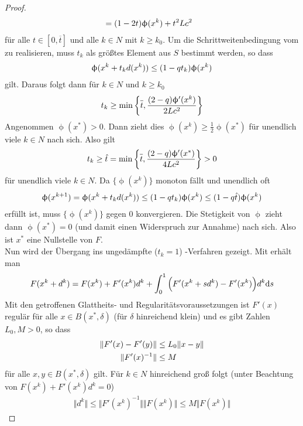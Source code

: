 \begin{proof}
\begin{align}
		&= (1-2t)\upphi(x^k) + t^2Lc^2 \notag
	\end{align}
	für alle $t\in [0,\overline{t}]$ und alle $k\in N$ mit $k\ge k_0$. Um die Schrittweitenbedingung vom  zu realisieren, muss $t_k$ als größtes Element aus $S$ bestimmt werden, so dass
	\begin{align}
		\upphi(x^k + t_kd(x^k)) \le (1-qt_k)\upphi(x^k)\notag
	\end{align}
	gilt. Daraus folgt dann für $k\in N$ und $k\ge k_0$
	\begin{align}
		t_k\ge \min\left\lbrace \overline{t},\frac{(2-q)\upphi'(x^k)}{2Lc^2}\right\rbrace \notag
	\end{align}
	Angenommen $\upphi(x^\ast)>0$. Dann zieht dies $\upphi(x^k)\ge \frac{1}{2}\upphi(x^\ast)$ für unendlich viele $k\in N$ nach sich. Also gilt
	\begin{align}
		t_k\ge \hat{t} = \min\left\lbrace \overline{t},\frac{(2-q)\upphi'(x^\ast)}{4Lc^2}\right\rbrace >0\notag
	\end{align}
	für unendlich viele $k\in N$. Da $\{\upphi(x^k)\}$ monoton fällt und unendlich oft
	\begin{align}
		\upphi(x^{k+1}) = \upphi(x^k+t_kd(x^k)) \le (1-qt_k)\upphi(x^k) \le (1-q\hat{t})\upphi(x^k)\notag
	\end{align}
	erfüllt ist, muss $\{\upphi(x^k)\}$ gegen 0 konvergieren. Die Stetigkeit von $\upphi$ zieht dann $\upphi(x^\ast)=0$ (und damit einen Widerspruch zur Annahme) nach sich. Also ist $x^\ast$ eine Nullstelle von $F$. \\
	Nun wird der Übergang ins ungedämpfte ($t_k=1$) -Verfahren gezeigt. Mit  erhält man
	\begin{align}
		\label{5.12}
		F(x^k+d^k) = F(x^k) + F'(x^k)d^k + \int_0^1 \Big(F'(x^k+sd^k) - F'(x^k)\Big)d^k\mathrm{d} s
	\end{align}
	Mit den getroffenen Glattheits- und Regularitätsvoraussetzungen ist $F'(x)$ regulär für alle $x\in B(x^\ast,\delta)$ (für $\delta$ hinreichend klein) und es gibt Zahlen $L_0,M>0$, so dass
	\begin{align}
		\Vert F'(x) - F'(y)\Vert &\le L_0\Vert x-y\Vert \notag \\
		\Vert F'(x)^{-1}\Vert &\le M\notag
	\end{align}
	für alle $x,y\in B(x^\ast,\delta)$ gilt. Für $k\in N$ hinreichend groß folgt (unter Beachtung von $F(x^k) + F'(x^k)d^k=0$)
	\begin{align}
		\label{5.13}
		\Vert d^k\Vert \le \Vert F'(x^k)^{-1}\Vert\Vert F(x^k)\Vert \le M\Vert F(x^k)\Vert

\end{align}
\end{proof}
